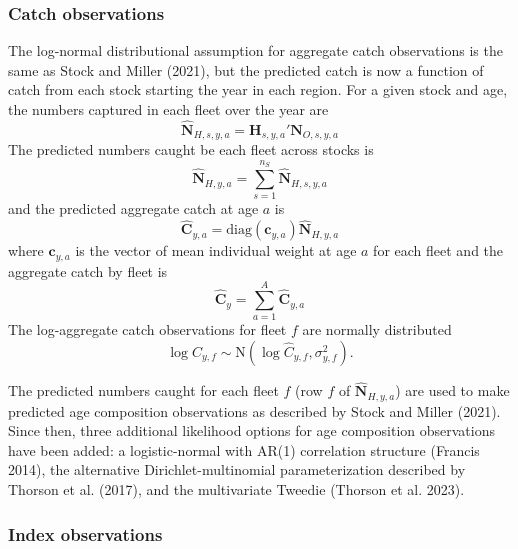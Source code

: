 \documentclass[
]{article}
\begin{document}
\hypertarget{catch-observations}{%
\subsubsection*{Catch observations}\label{catch-observations}}

The log-normal distributional assumption for aggregate catch
observations is the same as Stock and Miller (2021), but the predicted
catch is now a function of catch from each stock starting the year in
each region. For a given stock and age, the numbers captured in each
fleet over the year are
\[\widehat{\mathbf{N}}_{H,s,y,a} = \mathbf{H}_{s,y,a}' \mathbf{N}_{O,s,y,a}\]
The predicted numbers caught be each fleet across stocks is
\[\widehat{\mathbf{N}}_{H,y,a} = \sum^{n_S}_{s=1} \widehat{\mathbf{N}}_{H,s,y,a}\]
and the predicted aggregate catch at age \(a\) is
\[\widehat{\mathbf{C}}_{y,a} = \text{diag}\left(\mathbf{c}_{y,a}\right) \widehat{\mathbf{N}}_{H,y,a}\]
where \(\mathbf{c}_{y,a}\) is the vector of mean individual weight at
age \(a\) for each fleet and the aggregate catch by fleet is
\[\widehat{\mathbf{C}}_y = \sum^{A}_{a=1} \widehat{\mathbf{C}}_{y,a}\]
The log-aggregate catch observations for fleet \(f\) are normally
distributed
\[ \log C_{y,f} \sim \text{N}\left(\log \widehat {C}_{y,f}, \sigma^2_{y,f}\right).\]

The predicted numbers caught for each fleet \(f\) (row \(f\) of
\(\widehat{\mathbf{N}}_{H,y,a}\)) are used to make predicted age
composition observations as described by Stock and Miller (2021). Since
then, three additional likelihood options for age composition
observations have been added: a logistic-normal with AR(1) correlation
structure (Francis 2014), the alternative Dirichlet-multinomial
parameterization described by Thorson et al. (2017), and the
multivariate Tweedie (Thorson et al. 2023).

\hypertarget{index-observations}{%
\subsubsection*{Index observations}\label{index-observations}}
\end{document}
